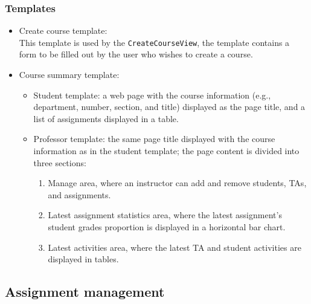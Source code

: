 \subsubsection{Templates}
\begin{itemize}
    \item Create course template: \\
        This template is used by the \texttt{CreateCourseView}, the template
        contains a form to be filled out by the user who
        wishes to create a course. 
    \item Course summary template:
    \begin{itemize}
        \item Student template: a web page with the course information
            (e.g., department, number, section, and title)
            displayed as the page title, and a list of assignments displayed
            in a table.
        \item Professor template: the same page title displayed with the course
            information as in the student template;
            the page content is divided into three sections:
            \begin{enumerate}
                \item Manage area, where an instructor can add and remove
                    students, TAs, and assignments.
                \item Latest assignment statistics area, where the latest
                    assignment's student grades proportion is displayed
                    in a horizontal bar chart.
                \item Latest activities area, where the latest TA and student
                    activities are displayed in tables.
            \end{enumerate}
    \end{itemize}
\end{itemize}

\FloatBarrier





\subsection{Assignment management}
\label{sec:ASM_MAN}

